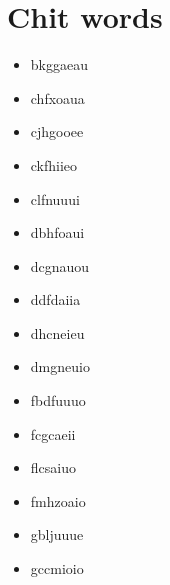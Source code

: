 \documentclass[conference]{IEEEtran}
\begin{document}
\section{Chit words}
\begin{itemize}
    \item bkggaeau
    \item chfxoaua
    \item cjhgooee
    \item ckfhiieo
    \item clfnuuui
    \item dbhfoaui
    \item dcgnauou
    \item ddfdaiia
    \item dhcneieu
    \item dmgneuio
    \item fbdfuuuo
    \item fcgcaeii
    \item flcsaiuo
    \item fmhzoaio
    \item gbljuuue
    \item gccmioio
\end{itemize}






\end{document}
